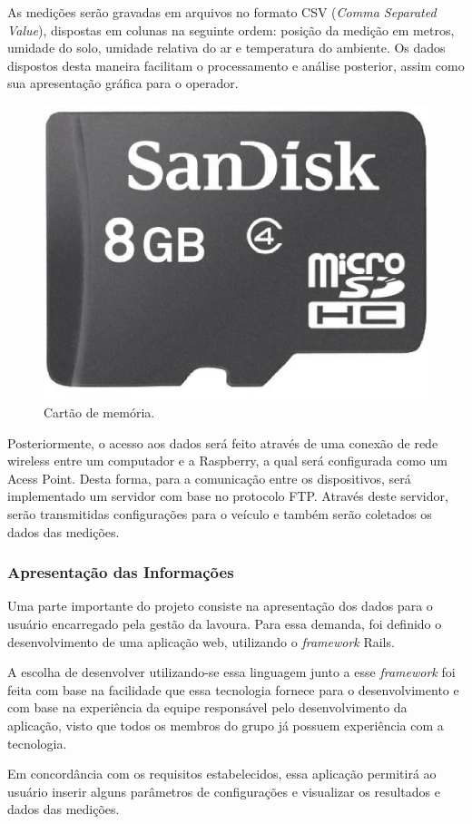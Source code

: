   As medições serão gravadas em arquivos no formato CSV (\textit{Comma Separated Value}),
  dispostas em colunas na seguinte ordem: posição da medição
  em metros, umidade do solo, umidade relativa do ar e temperatura do
  ambiente.
  Os dados dispostos desta maneira facilitam o processamento e
  análise posterior, assim como sua apresentação gráfica para
  o operador.

  \begin{figure}[!htbp]
  \begin{center}
  \includegraphics[width=.2\textwidth]{figuras/sdcard.eps}
  \caption{\label{fig:sdcard}Cartão de memória.}
  \end{center}
  \end{figure}

  Posteriormente, o acesso aos dados será feito através de uma conexão de  rede
  wireless entre um computador e a Raspberry, a qual será configurada como
  um Acess Point. Desta forma, para a comunicação entre os
  dispositivos, será implementado um servidor com base no protocolo FTP. Através
  deste servidor, serão transmitidas configurações para o veículo e também serão
  coletados os dados das medições.

  \subsubsection{Apresentação das Informações}

  Uma parte importante do projeto consiste na apresentação dos
  dados para o usuário encarregado pela gestão da lavoura. Para essa demanda,
  foi definido o desenvolvimento de uma aplicação web, utilizando
  o \textit{framework} Rails.

  A escolha de desenvolver utilizando-se essa linguagem junto a
  esse \textit{framework} foi feita com base na facilidade que essa
  tecnologia fornece para o desenvolvimento e com base na experiência
  da equipe responsável pelo desenvolvimento da aplicação, visto que
  todos os membros do grupo já possuem experiência com a tecnologia.

  Em concordância com os requisitos estabelecidos, essa aplicação
  permitirá ao usuário inserir alguns parâmetros de configurações e visualizar
  os resultados e dados das medições.


